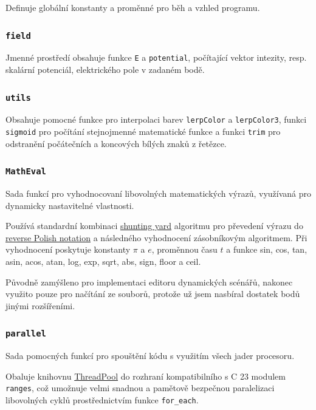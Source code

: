 \documentclass[12pt,a4paper]{article}
\newcommand{\code}[1]{\texttt{#1}}
\def\CC{{C\nolinebreak[4]\hspace{-.05em}\raisebox{.4ex}{\tiny\bf ++}}}
\begin{document}
Definuje globální konstanty a proměnné pro běh a vzhled programu.

\subsubsection{\code{field}}

Jmenné prostředí obsahuje funkce \code{E} a \code{potential}, počítající vektor
intezity, resp. skalární potenciál, elektrického pole v zadaném bodě.

\subsubsection{\code{utils}}

Obsahuje pomocné funkce pro interpolaci barev \code{lerpColor} a \code{lerpColor3},
funkci \code{sigmoid} pro počítání stejnojmenné matematické funkce a funkci
\code{trim} pro odstranění počátečních a koncových bílých znaků z řetězce.

\subsubsection{\code{MathEval}}

Sada funkcí pro vyhodnocovaní libovolných matematických výrazů, využívaná pro
dynamicky nastavitelné vlastnosti.

Používá standardní kombinaci
\href{https://en.wikipedia.org/wiki/Shunting_yard_algorithm}{shunting yard}
algoritmu pro převedení výrazu do
\href{https://en.wikipedia.org/wiki/Reverse_Polish_notation}{reverse Polish
notation} a následného vyhodnocení zásobníkovým algoritmem. Při vyhodnocení
poskytuje konstanty $\pi$ a $e$, proměnnou času $t$ a funkce sin, cos, tan,
asin, acos, atan, log, exp, sqrt, abs, sign, floor a ceil.

Původně zamýšleno pro implementaci editoru dynamických scénářů, nakonec využito
pouze pro načítání ze souborů, protože už jsem nasbíral dostatek bodů jinými
rozšířeními.

\subsubsection{\code{parallel}}

Sada pomocných funkcí pro spouštění kódu s využitím všech jader procesoru.

Obaluje knihovnu \href{https://github.com/progschj/ThreadPool}{ThreadPool} do
rozhraní kompatibilního s \CC{} 23 modulem \code{ranges}, což umožnuje velmi
snadnou a pamětově bezpečnou paralelizaci libovolných cyklů prostřednictvím
funkce \code{for\_each}.
\end{document}

